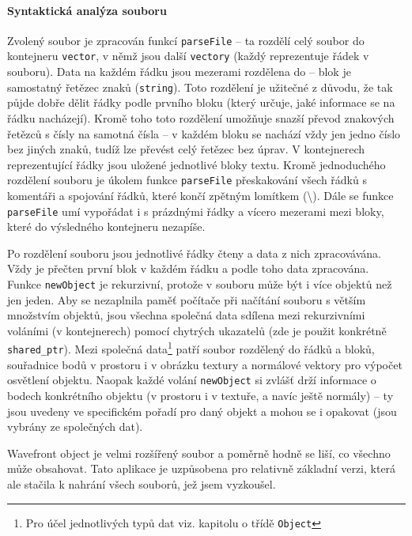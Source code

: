 \documentclass[a4paper, 12pt]{report}
\begin{document}
\paragraph{Syntaktická analýza souboru}
Zvolený soubor je zpracován funkcí \texttt{parseFile} -- ta rozdělí celý soubor do kontejneru \texttt{vector}, v němž jsou další \texttt{vectory} (každý reprezentuje řádek v souboru). Data na každém řádku jsou mezerami rozdělena do  -- blok je samostatný řetězec znaků (\texttt{string}). Toto rozdělení je užitečné z důvodu, že tak půjde dobře dělit řádky podle prvního bloku (který určuje, jaké informace se na řádku nacházejí). Kromě toho toto rozdělení umožňuje snazší převod znakových řetězců s čísly na samotná čísla -- v každém bloku se nachází vždy jen jedno číslo bez jiných znaků, tudíž lze převést celý řetězec bez úprav. V kontejnerech reprezentující řádky jsou uložené jednotlivé bloky textu. Kromě jednoduchého rozdělení souboru je úkolem funkce \texttt{parseFile} přeskakování všech řádků s komentáři a spojování řádků, které končí zpětným lomítkem (\textbackslash). Dále se funkce \texttt{parseFile} umí vypořádat i s prázdnými řádky a vícero mezerami mezi bloky, které do výsledného kontejneru nezapíše.

Po rozdělení souboru jsou jednotlivé řádky čteny a data z nich zpracovávána. Vždy je přečten první blok v každém řádku a podle toho data zpracována. Funkce \texttt{newObject} je rekurzivní, protože v souboru může být i více objektů než jen jeden. Aby se nezaplnila paměť počítače při načítání souboru s větším množstvím objektů, jsou všechna společná data sdílena mezi rekurzivními voláními (v kontejnerech) pomocí chytrých ukazatelů (zde je použit konkrétně \texttt{shared\_ptr}). Mezi společná data\footnote{Pro účel jednotlivých typů dat viz. kapitolu o třídě \texttt{Object}} patří soubor rozdělený do řádků a bloků, souřadnice bodů v prostoru i v obrázku textury a normálové vektory pro výpočet osvětlení objektu. Naopak každé volání \texttt{newObject} si zvlášť drží informace o bodech konkrétního objektu (v prostoru i v textuře, a navíc ještě normály) -- ty jsou uvedeny ve specifickém pořadí pro daný objekt a mohou se i opakovat (jsou vybrány ze společných dat).

Wavefront object je velmi rozšířený soubor a poměrně hodně se liší, co všechno může obsahovat. Tato aplikace je uzpůsobena pro relativně základní verzi, která ale stačila k nahrání všech souborů, jež jsem vyzkoušel.
\end{document}

